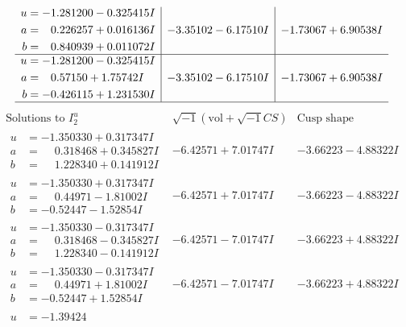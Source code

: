 \documentclass[1p]{elsarticle_modified}
\theoremstyle{definition}
\newcommand{\I}{\sqrt{-1}}
\begin{document}
$$\begin{array}{c|c|c}
\begin{aligned}
u &= -1.281200 - 0.325415 I \\
a &= \phantom{-}0.226257 + 0.016136 I \\
b &= \phantom{-}0.840939 + 0.011072 I\end{aligned}
 & -3.35102 - 6.17510 I & -1.73067 + 6.90538 I \\ \hline\begin{aligned}
u &= -1.281200 - 0.325415 I \\
a &= \phantom{-}0.57150 + 1.75742 I \\
b &= -0.426115 + 1.231530 I\end{aligned}
 & -3.35102 - 6.17510 I & -1.73067 + 6.90538 I\\
 \hline 
 \end{array}$$\newpage$$\begin{array}{c|c|c}  
\text{Solutions to }I^u_{2}& \I (\text{vol} + \sqrt{-1}CS) & \text{Cusp shape}\\
 \hline 
\begin{aligned}
u &= -1.350330 + 0.317347 I \\
a &= \phantom{-}0.318468 + 0.345827 I \\
b &= \phantom{-}1.228340 + 0.141912 I\end{aligned}
 & -6.42571 + 7.01747 I & -3.66223 - 4.88322 I \\ \hline\begin{aligned}
u &= -1.350330 + 0.317347 I \\
a &= \phantom{-}0.44971 - 1.81002 I \\
b &= -0.52447 - 1.52854 I\end{aligned}
 & -6.42571 + 7.01747 I & -3.66223 - 4.88322 I \\ \hline\begin{aligned}
u &= -1.350330 - 0.317347 I \\
a &= \phantom{-}0.318468 - 0.345827 I \\
b &= \phantom{-}1.228340 - 0.141912 I\end{aligned}
 & -6.42571 - 7.01747 I & -3.66223 + 4.88322 I \\ \hline\begin{aligned}
u &= -1.350330 - 0.317347 I \\
a &= \phantom{-}0.44971 + 1.81002 I \\
b &= -0.52447 + 1.52854 I\end{aligned}
 & -6.42571 - 7.01747 I & -3.66223 + 4.88322 I \\ \hline\begin{aligned}
u &= -1.39424\phantom{ +0.000000I} \\

\end{aligned}
\end{array}$$
\end{document}
